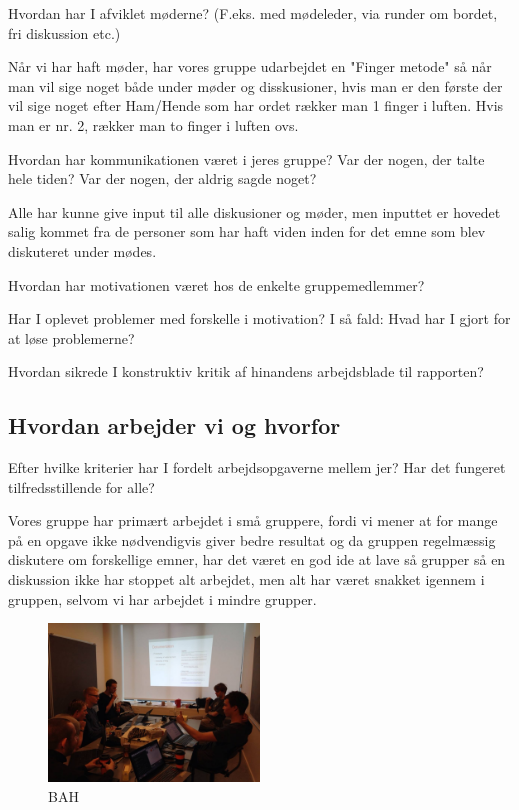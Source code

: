 \documentclass[a4paper,12pt,twoside,openright]{memoir}
\begin{document}
Hvordan har I afviklet møderne? (F.eks. med mødeleder, via runder om bordet, fri diskussion etc.)\newline

Når vi har haft møder, har vores gruppe udarbejdet en "Finger metode" så når man vil sige noget både under møder og disskusioner, hvis man er den første der vil sige noget efter Ham/Hende som har ordet rækker man 1 finger i luften. Hvis man er nr. 2, rækker man to finger i luften ovs.\newline

Hvordan har kommunikationen været i jeres gruppe? Var der nogen, der talte hele tiden? Var der nogen, der aldrig sagde noget?\newline

Alle har kunne give input til alle diskusioner og møder, men inputtet er hovedet salig kommet fra de personer som har haft viden inden for det  emne som blev diskuteret under mødes.\newline

Hvordan har motivationen været hos de enkelte gruppemedlemmer?\newline

Har I oplevet problemer med forskelle i motivation? I så fald: Hvad har I gjort for at løse problemerne?\newline

Hvordan sikrede I konstruktiv kritik af hinandens arbejdsblade til rapporten?\newline

        \subsection{Hvordan arbejder vi og hvorfor}

Efter hvilke kriterier har I fordelt arbejdsopgaverne mellem jer? Har det fungeret tilfredsstillende for alle?\newline

Vores gruppe har primært arbejdet i små gruppere, fordi vi mener at for mange på en opgave ikke nødvendigvis giver bedre resultat og da gruppen regelmæssig diskutere om forskellige emner, har det været en god ide at lave så grupper så en diskussion ikke har stoppet alt arbejdet, men alt har været snakket igennem i gruppen, selvom vi har arbejdet i mindre grupper.\newline

            \begin{figure}[ht!]
                \centering
                \includegraphics[width=0.5\textwidth]{Images/8.jpg}
                \caption{BAH}
                \label{4}
            \end{figure}
\end{document}
